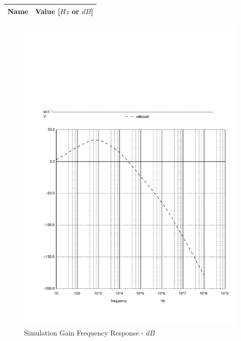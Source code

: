 \begin{center}
  \begin{tabular}{ | c | c | }
    \hline    
    {\bf Name} & {\bf Value [$Hz$ or $dB$]} \\ \hline
    
    \hline
  \end{tabular}
\end{center}

\begin{figure}[H]
      \includegraphics[width=\linewidth]{../sim/vo1f.pdf}
      \caption{Simulation Gain Frequency Response - $dB$}
    \endminipage\hfill

\end{figure}
